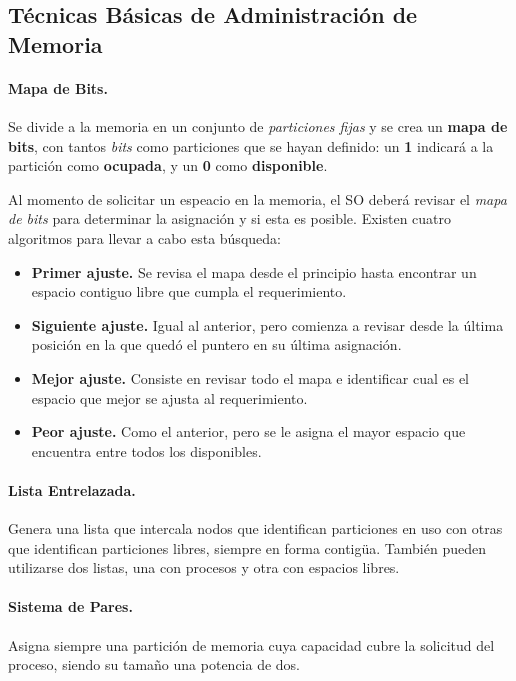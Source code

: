 \documentclass[10pt,a4paper]{article}
\begin{document}
\subsection{Técnicas Básicas de Administración de Memoria}

\paragraph{Mapa de Bits.} Se divide a la memoria en un conjunto de \textit{particiones fijas} y se crea un \textbf{mapa de bits}, con tantos \textit{bits} como particiones que se hayan definido: un \textbf{1} indicará a la partición como \textbf{ocupada}, y un \textbf{0} como \textbf{disponible}.

Al momento de solicitar un espeacio en la memoria, el SO deberá revisar el \textit{mapa de bits} para determinar la asignación y si esta es posible. Existen cuatro algoritmos para llevar a cabo esta búsqueda:
\begin{itemize}
\item \textbf{Primer ajuste.} Se revisa el mapa desde el principio hasta encontrar un espacio contiguo libre que cumpla el requerimiento.
\item \textbf{Siguiente ajuste.} Igual al anterior, pero comienza a revisar desde la última posición en la que quedó el puntero en su última asignación.
\item \textbf{Mejor ajuste.} Consiste en revisar todo el mapa e identificar cual es el espacio que mejor se ajusta al requerimiento.
\item \textbf{Peor ajuste.} Como el anterior, pero se le asigna el mayor espacio que encuentra entre todos los disponibles.
\end{itemize}

\paragraph{Lista Entrelazada.}  Genera una lista que intercala nodos que identifican particiones en uso con otras que identifican particiones libres, siempre en forma contigüa. También pueden utilizarse dos listas, una con procesos y otra con espacios libres.

\paragraph{Sistema de Pares.} Asigna siempre una partición de memoria cuya capacidad cubre la solicitud del proceso, siendo su tamaño una potencia de dos.
\end{document}
